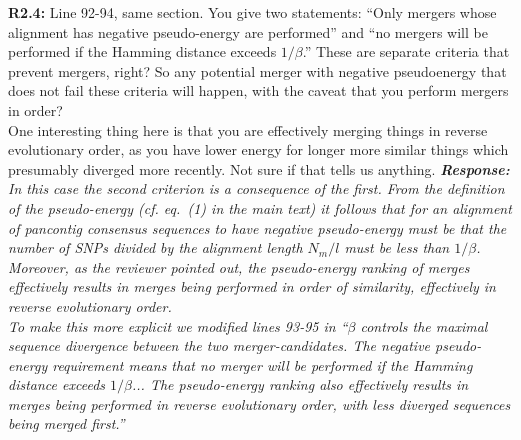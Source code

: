 \documentclass[aps,rmp,onecolumn]{revtex4-1}
\newcommand{\Marco}[1]{{\color{gray}Marco: #1}}
\newcommand{\Liam}[1]{{\color{teal}Liam: #1}}
\newcommand{\reviewer}[2]{\textbf{#1:} #2\vskip 5mm}
\newcommand{\response}[1]{{\it {\color{response}\textbf{Response:} #1}}\vskip 5mm}
\begin{document}
\reviewer{R2.4}{Line 92-94, same section. You give two statements:
      ``Only mergers whose alignment has negative pseudo-energy are performed''
      and
      ``no mergers will be performed if the Hamming distance exceeds $1/\beta$.''
      These are separate criteria that prevent mergers, right? So any potential merger with negative pseudoenergy that does not fail these criteria will happen, with the caveat that you perform mergers in order?\\
      One interesting thing here is that you are effectively merging things in reverse evolutionary order, as you have lower energy for longer more similar things which presumably diverged more recently. Not sure if that tells us anything.}
\response{
      In this case the second criterion is a consequence of the first. From the definition of the pseudo-energy (cf. eq.~(1) in the main text) it follows that for an alignment of pancontig consensus sequences to have negative pseudo-energy must be that the number of SNPs divided by the alignment length $N_m/l$ must be less than $1/\beta$. Moreover, as the reviewer pointed out, the pseudo-energy ranking of merges effectively results in merges being performed in order of similarity, effectively in reverse evolutionary order.\\
      To make this more explicit we modified lines 93-95 in ``$\beta$ controls the maximal sequence divergence between the two merger-candidates. The negative pseudo-energy requirement means that no merger will be performed if the Hamming distance exceeds $1/\beta$... The pseudo-energy ranking also effectively results in merges being performed in reverse evolutionary order, with less diverged sequences being merged first.''
}
\end{document}

